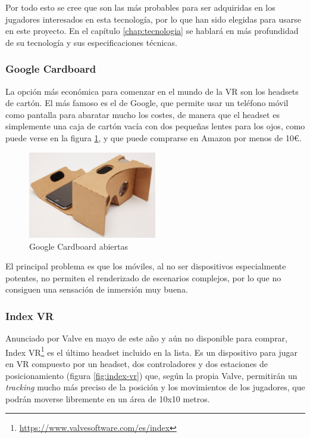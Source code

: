 Por todo esto se cree que son las más probables para ser adquiridas en los jugadores interesados en esta tecnología, por lo que han sido elegidas para usarse en este proyecto. En el capítulo \ref{chap:tecnologia} se hablará en más profundidad de su tecnología y sus especificaciones técnicas.

\subsubsection{Google Cardboard} 

La opción más económica para comenzar en el mundo de la \acs{VR} son los headsets de cartón. El más famoso es el de Google, que permite usar un teléfono móvil como pantalla para abaratar mucho los costes, de manera que el headset es simplemente una caja de cartón vacía con dos pequeñas lentes para los ojos, como puede verse en la figura \ref{fig:google-cardboard}, y que puede comprarse en Amazon por menos de 10\euro.
    
\begin{figure}[!h]
\begin{center}
\includegraphics[width=0.5\textwidth]{imagenes/2/cardboard.jpg}
\caption{Google Cardboard abiertas}
\label{fig:google-cardboard}
\end{center}
\end{figure}

El principal problema es que los móviles, al no ser dispositivos especialmente potentes, no permiten el renderizado de escenarios complejos, por lo que no consiguen una sensación de inmersión muy buena.

\subsubsection{Index VR}

Anunciado por Valve en mayo de este año y aún no disponible para comprar, Index VR\footnote{\url{https://www.valvesoftware.com/es/index}} es el último headset incluido en la lista. Es un dispositivo para jugar en \acs{VR} compuesto por un headset, dos controladores y dos estaciones de posicionamiento (figura \ref{fig:index-vr}) que, según la propia Valve, permitirán un \textit{tracking} mucho más preciso de la posición y los movimientos de los jugadores, que podrán moverse libremente en un área de 10x10 metros.

